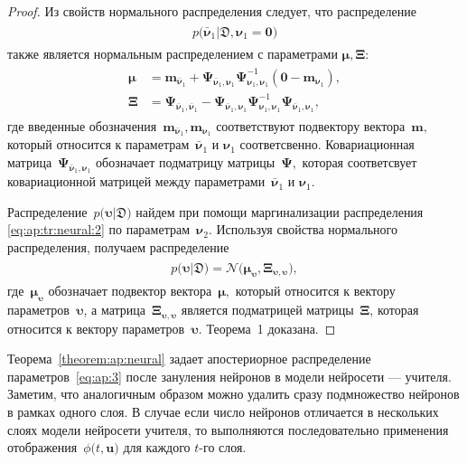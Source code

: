 \documentclass[12pt]{a&t}
\begin{document}
\begin{proof}
Из свойств нормального распределения следует, что распределение
\begin{gather}
\label{eq:ap:tr:neural:2}
\begin{aligned}
p\bigr(\bar{\bm{\nu}}_1|\mathfrak{D}, \bm{\nu}_1=\mathbf{0}\bigr)
\end{aligned}
\end{gather}
также является нормальным распределением с параметрами $\bm{\mu}, \bm{\Xi}$:
\begin{gather}
\label{eq:ap:tr:1:1}
\begin{aligned}
\bm{\mu} &= \mathbf{m}_{\bar{\bm{\nu}}_1}+\bm{\Psi}_{\bar{\bm{\nu}}_1,\bm{\nu}_1} \bm{\Psi}_{\bm{\nu}_1,\bm{\nu}_1}^{-1} \left(\mathbf{0} - \mathbf{m}_{\bm{\nu}_1}\right), \\
 \bm{\Xi} &= \bm{\Psi}_{\bar{\bm{\nu}}_1,\bar{\bm{\nu}}_1} - \bm{\Psi}_{\bar{\bm{\nu}}_1,\bm{\nu}_1} \bm{\Psi}_{\bm{\nu}_1,\bm{\nu}_1}^{-1} \bm{\Psi}_{\bar{\bm{\nu}}_1,\bm{\nu}_1},
\end{aligned}
\end{gather}
где введенные обозначения~$\mathbf{m}_{\bar{\bm{\nu}}_1}, \mathbf{m}_{\bm{\nu}_1}$ соответствуют подвектору вектора~$\mathbf{m},$ который относится к параметрам~$\bar{\bm{\nu}}_1$ и $\bm{\nu}_1$ соответсвенно. Ковариационная матрица~$\bm{\Psi}_{\bar{\bm{\nu}}_1,\bm{\nu}_1}$ обозначает подматрицу матрицы~$\bm{\Psi},$ которая соответсвует ковариационной матрицей между параметрами~$\bar{\bm{\nu}}_1$ и $\bm{\nu}_1.$

Распределение~$p\bigr(\bm{\upsilon}|\mathfrak{D}\bigr)$ найдем при помощи маргинализации распределения \eqref{eq:ap:tr:neural:2} по параметрам~$\bm{\nu}_2.$ Используя свойства нормального распределения, получаем распределение
\begin{gather}
\label{eq:ap:3}
\begin{aligned}
p\bigr(\bm{\upsilon}|\mathfrak{D}\bigr) = \mathcal{N}\bigr(\bm{\mu}_{\bm{\upsilon}},  \bm{\Xi}_{\bm{\upsilon}, \bm{\upsilon}}\bigr),
\end{aligned}
\end{gather}
где~$\bm{\mu}_{\bm{\upsilon}}$ обозначает подвектор вектора~$\bm{\mu},$ который относится к вектору параметров~$\bm{\upsilon}$, а матрица~$\bm{\Xi}_{\bm{\upsilon}, \bm{\upsilon}}$ является подматрицей матрицы~$\bm{\Xi}$, которая относится к вектору параметров~$\bm{\upsilon}.$ Теорема~1 доказана.
\end{proof}

Теорема~\ref{theorem:ap:neural} задает апостериорное распределение параметров~\eqref{eq:ap:3} после зануления нейронов в модели нейросети --- учителя. Заметим, что аналогичным образом можно удалить сразу подмножество нейронов в рамках одного слоя. В случае если число нейронов отличается в нескольких слоях модели нейросети учителя, то выполняются последовательно применения отображения~$\phi\bigr(t, \mathbf{u}\bigr)$ для каждого $t$-го слоя.
\end{document}
